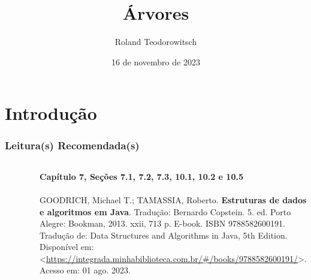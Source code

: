\documentclass[aspectratio=169]{beamer}
\title[\sc{Árvores}]{Árvores}
\author[Roland Teodorowitsch]{Roland Teodorowitsch}
\institute[ALEST I - EP - PUCRS]{Algoritmos e Estruturas de Dados I - Escola Politécnica - PUCRS}
\date{16 de novembro de 2023}
\begin{document}
\justifying

\begin{frame}
	\titlepage
\end{frame}

\section{Introdução}

\begin{frame}\frametitle{Leitura(s) Recomendada(s)}

\begin{columns}[T]
\begin{column}{0.15\linewidth}
\vspace{-3mm}
\begin{figure}[h]
	\centering
	\includegraphics[height=0.3\paperheight]{imagens/livro_goodrich.jpg}
\end{figure}
\end{column}
\begin{column}{0.85\linewidth}
\tiny{\textbf{Capítulo 7, Seções 7.1, 7.2, 7.3, 10.1, 10.2 e 10.5}\\
~}\\
\scriptsize{GOODRICH, Michael T.; TAMASSIA, Roberto. \textbf{Estruturas de dados e algoritmos em Java}. Tradução: Bernardo Copstein. 5. ed. Porto Alegre: Bookman, 2013. xxii, 713 p. E-book. ISBN 9788582600191. Tradução de: Data Structures and Algorithms in Java, 5th Edition. Disponível em: \textless{}\url{https://integrada.minhabiblioteca.com.br/\#/books/9788582600191/}\textgreater{}. Acesso em: 01 ago. 2023.}
\end{column}
\end{columns}

\end{frame}

\end{document}
